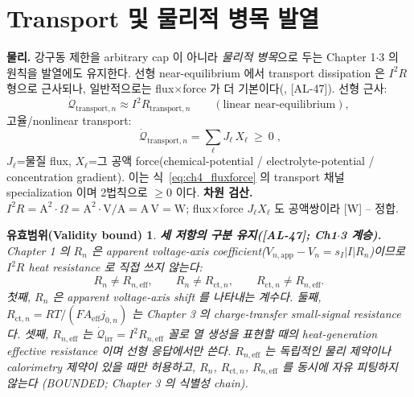\documentclass[11pt,a4paper]{article}
\newtheorem*{boundbox}{유효범위(Validity bound)}
\newcommand{\eff}{\mathrm{eff}}
\newcommand{\app}{\mathrm{app}}
\newcommand{\irr}{\mathrm{irr}}
\newcommand{\ct}{\mathrm{ct}}
\newcommand{\transp}{\mathrm{transport}}
\newcommand{\AL}[1]{\textsf{[AL-#1]}}
\begin{document}
\section{Transport 및 물리적 병목 발열}\label{sec:ch4_transport}
\textbf{물리.} 강구동 제한을 arbitrary cap 이 아니라 \emph{물리적 병목}으로 두는 Chapter 1$\cdot$3 의 원칙을
발열에도 유지한다. 선형 near-equilibrium 에서 transport dissipation 은 $I^2R$ 형으로 근사되나, 일반적으로는
flux$\times$force 가 더 기본이다(\cite{newman,bardfaulkner}, \AL{47}). 선형 근사:
\begin{equation}
\dot{\mathcal Q}_{\transp,n}\approx I^2 R_{\transp,n}\qquad(\text{linear near-equilibrium}),
\label{eq:ch4_transport_i2r}
\end{equation}
고율/nonlinear transport:
\begin{equation}
\boxed{\;\dot{\mathcal Q}_{\transp,n}=\sum_\ell J_\ell\,X_\ell\ \ge\ 0\;,}
\label{eq:ch4_transport_ff}
\end{equation}
$J_\ell$=물질 flux, $X_\ell$=그 공액 force(chemical-potential / electrolyte-potential / concentration
gradient). 이는 식~\eqref{eq:ch4_fluxforce} 의 transport 채널 specialization 이며 2법칙으로 $\ge0$ 이다.
\textbf{차원 검산.} $I^2R=\mathrm{A^2}\cdot\Omega=\mathrm{A^2}\cdot\mathrm{V/A}=\mathrm{A\,V}=\mathrm W$; flux$\times$force
$J_\ell X_\ell$ 도 공액쌍이라 [W] -- 정합.
\begin{boundbox}
\textbf{세 저항의 구분 유지(\AL{47}; Ch1$\cdot$3 계승).} Chapter 1 의 $R_n$ 은 apparent voltage-axis
coefficient($V_{n,\app}-V_n=s_I|I|R_n$)이므로 $I^2R$ heat resistance 로 \emph{직접} 쓰지 않는다:
\begin{equation}
R_n\ne R_{n,\eff},\qquad R_n\ne R_{\ct,n},\qquad R_{\ct,n}\ne R_{n,\eff}.
\label{eq:ch4_Rsep}
\end{equation}
첫째, $R_n$ 은 apparent voltage-axis shift 를 나타내는 계수다. 둘째,
$R_{\ct,n}=RT/(FA_\eff j_{0,n})$ 는 Chapter 3 의 charge-transfer small-signal resistance 다.
셋째, $R_{n,\eff}$ 는 $\dot{\mathcal Q}_\irr=I^2R_{n,\eff}$ 꼴로 열 생성을 표현할 때의
heat-generation effective resistance 이며 선형 응답에서만 쓴다. $R_{n,\eff}$ 는 독립적인 물리 제약이나
calorimetry 제약이 있을 때만 허용하고, $R_n$, $R_{\ct,n}$, $R_{n,\eff}$ 를 동시에 자유 피팅하지 않는다
(BOUNDED; Chapter 3 의 식별성 chain).
\end{boundbox}

\end{document}
